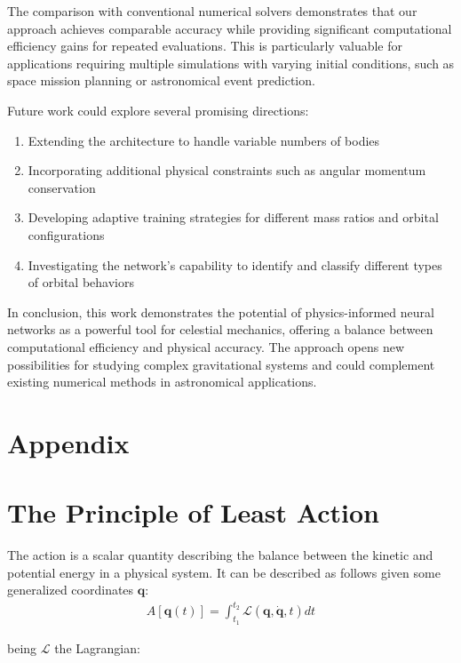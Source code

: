 \documentclass[draft]{agujournal2019}
\begin{document}
The comparison with conventional numerical solvers demonstrates that our approach achieves comparable accuracy while providing significant computational efficiency gains for repeated evaluations. This is particularly valuable for applications requiring multiple simulations with varying initial conditions, such as space mission planning or astronomical event prediction.

Future work could explore several promising directions:
\begin{enumerate}
    \item Extending the architecture to handle variable numbers of bodies
    \item Incorporating additional physical constraints such as angular momentum conservation
    \item Developing adaptive training strategies for different mass ratios and orbital configurations
    \item Investigating the network's capability to identify and classify different types of orbital behaviors
\end{enumerate}

In conclusion, this work demonstrates the potential of physics-informed neural networks as a powerful tool for celestial mechanics, offering a balance between computational efficiency and physical accuracy. The approach opens new possibilities for studying complex gravitational systems and could complement existing numerical methods in astronomical applications.

\section{Appendix}
\appendix
\section{The Principle of Least Action}
\begin{definition}
    The action is a scalar quantity describing the balance between the kinetic and potential energy in a physical system. It can be described as follows given some generalized coordinates $\mathbf{q}$:
    \begin{align}
        A\left[ \mathbf{q}(t) \right] = \int_{t_1}^{t_2} \mathcal{L}\left(\mathbf{q}, \dot{\mathbf{q}}, t\right) dt
    \end{align}
\end{definition}

being $\mathcal{L}$ the Lagrangian:
\end{document}
